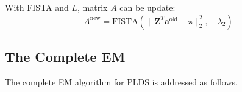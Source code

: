 \documentclass[fleqn]{article}
\newcommand{\T}{T}
\begin{document}
%
%



With FISTA and $L$, matrix $A$ can be update:
\begin{equation}\label{eq:updatea}
A^{\text{new}} = \text{FISTA}(\|\mathbf{Z}^{\T}\mathbf{a}^{\text{old}} -\mathbf{z}\|_2^2,\quad \lambda_2)
\end{equation}

\subsection{The Complete EM}
The complete EM algorithm for PLDS is addressed as follows.\\
\end{document}
